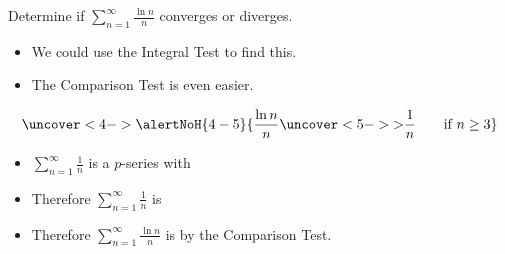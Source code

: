 \begin{frame}
\begin{example}
Determine if $\sum_{n=1}^\infty \frac{\ln n}{n}$ converges or diverges.
\begin{itemize}
\item<2->  We could use the Integral Test to find this.
\item<3->  The Comparison Test is even easier.
\end{itemize}
\abovedisplayskip=0pt
\belowdisplayskip=0pt
\[
\uncover<4->{%
\alertNoH{ 4-5}{%
\frac{\ln n}{n} \uncover<5->{ > } \frac{1}{n} \qquad \textrm{if} \ n \geq 3
}}%
\]
\begin{itemize}
\item<6->  $\sum_{n=1}^\infty \frac{1}{n}$ is a $p$-series with 
\item<8-| alert@8-9>  Therefore $\sum_{n=1}^\infty \frac{1}{n}$ is 
\item<10-| alert@10-11>  Therefore $\sum_{n=1}^\infty \frac{\ln n}{n}$ is  by the Comparison Test.
\end{itemize}
\end{example}
\end{frame}
